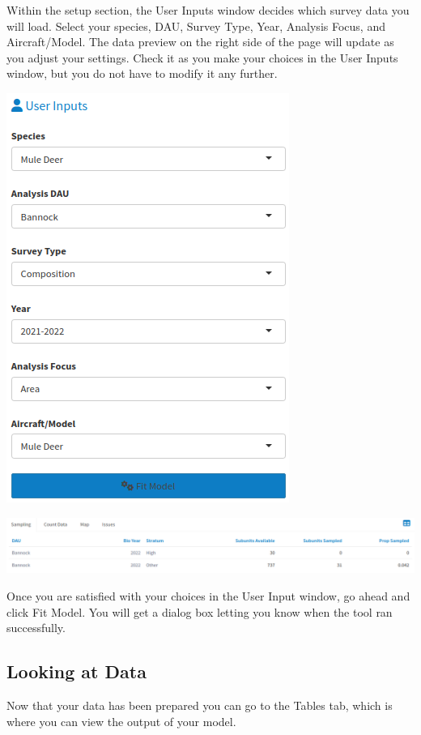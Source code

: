 \documentclass[
]{book}
\begin{document}
Within the setup section, the User Inputs window decides which survey data you will load. Select your species, {DAU}, Survey Type, Year, Analysis Focus, and Aircraft/Model. The data preview on the right side of the page will update as you adjust your settings. Check it as you make your choices in the User Inputs window, but you do not have to modify it any further.

\includegraphics{./www/sight_walk2.png}

\includegraphics{./www/sight_walk3.png}

Once you are satisfied with your choices in the User Input window, go ahead and click {Fit Model}. You will get a dialog box letting you know when the tool ran successfully.

\hypertarget{sight-look}{%
\subsection{Looking at Data}\label{sight-look}}

Now that your data has been prepared you can go to the Tables tab, which is where you can view the output of your model.
\end{document}
